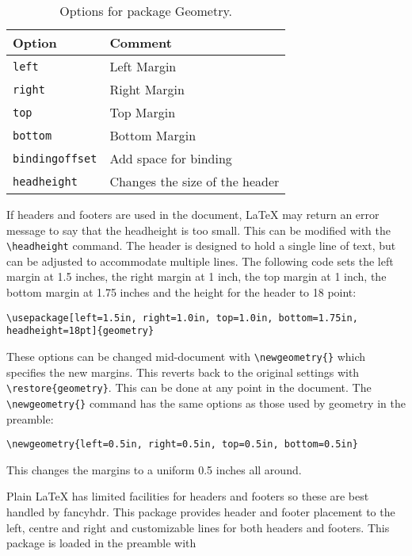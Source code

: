 \documentclass[a4paper]{article}
\begin{document}
\begin{table}
	\small
	\begin{center}
		\begin{tabular}{ll}
			\hline
			Option & Comment \\
			\hline
			\texttt{left}          & Left Margin \\
			\texttt{right}         & Right Margin \\
			\texttt{top}           & Top Margin \\
			\texttt{bottom}        & Bottom Margin \\
			\texttt{bindingoffset} & Add space for binding \\
			\texttt{headheight}    & Changes the size of the header \\
			\hline
		\end{tabular}
		\caption{Options for package Geometry.}
	\end{center}
\end{table}


If headers and footers are used in the document, LaTeX may return an error message to say that the headheight is too small. This can be modified with the \texttt{\textbackslash headheight} command. The header is designed to hold a single line of text, but can be adjusted to accommodate multiple lines. The following code sets the left margin at 1.5 inches, the right margin at 1 inch, the top margin at 1 inch, the bottom margin at 1.75 inches and the height for the header to 18 point:

\begin{verbatim}
\usepackage[left=1.5in, right=1.0in, top=1.0in, bottom=1.75in, 
headheight=18pt]{geometry}
\end{verbatim}

These options can be changed mid-document with \texttt{\textbackslash newgeometry\{\}} which specifies the new margins. This reverts back to the original settings with\texttt{ \textbackslash restore\{geometry\}}. This can be done at any point in the document. The \texttt{\textbackslash newgeometry\{\}} command has the same options as those used by geometry in the preamble:

\begin{verbatim}
\newgeometry{left=0.5in, right=0.5in, top=0.5in, bottom=0.5in}
\end{verbatim}

This changes the margins to a uniform 0.5 inches all around.


Plain LaTeX has limited facilities for headers and footers so these are best handled by fancyhdr. This package provides header and footer placement to the left, centre and right and customizable lines for both headers and footers. This package is loaded in the preamble with
\end{document}
